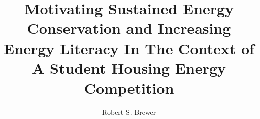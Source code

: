 \documentclass[11pt,final,times,dissertation,proposal]{uhthesis2e}
\begin{document}
\title{Motivating Sustained Energy Conservation and Increasing Energy Literacy In The Context of A Student Housing Energy Competition}
\author{Robert S. Brewer}

\maketitle

\begin{frontmatter}

\signaturepage


%

%



\listoffixmes

\tableofcontents

\listoftables

\listoffigures


\end{frontmatter}
\end{document}
